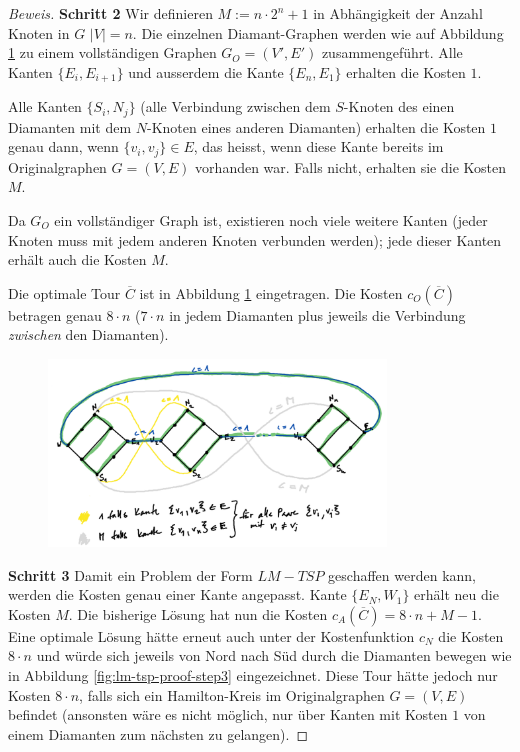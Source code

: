 \documentclass[a4paper,11pt]{scrreprt}
\begin{document}
\begin{proof}[Beweis]
\textbf{Schritt 2} Wir definieren $M := n \cdot 2^n + 1$ in Abhängigkeit der Anzahl Knoten in $G$ $|V| = n$. Die einzelnen Diamant-Graphen werden wie auf Abbildung \ref{fig:lm-tsp-proof-step2} zu einem vollständigen Graphen $G_O = (V', E')$ zusammengeführt. Alle Kanten $\{E_i, E_{i+1}\}$ und ausserdem die Kante $\{E_n, E_1\}$ erhalten die Kosten $1$. 

Alle Kanten $\{S_i, N_j\}$ (alle Verbindung zwischen dem $S$-Knoten des einen Diamanten mit dem $N$-Knoten eines anderen Diamanten) erhalten die Kosten $1$ genau dann, wenn $\{v_i, v_j\} \in E$, das heisst, wenn diese Kante bereits im Originalgraphen $G = (V, E)$ vorhanden war. Falls nicht, erhalten sie die Kosten $M$. 

Da $G_O$ ein vollständiger Graph ist, existieren noch viele weitere Kanten (jeder Knoten muss mit jedem anderen Knoten verbunden werden); jede dieser Kanten erhält auch die Kosten $M$. 

Die optimale Tour $\overline{C}$ ist in Abbildung \ref{fig:lm-tsp-proof-step2} eingetragen. Die Kosten $c_O(\overline{C})$ betragen genau $8 \cdot n$ ($7 \cdot n$ in jedem Diamanten plus jeweils die Verbindung \emph{zwischen} den Diamanten).

\begin{figure}[H]
\centering
\includegraphics[width=0.8\textwidth]{lm_tsp_proof_step2.png}
\caption{}
\label{fig:lm-tsp-proof-step2}
\end{figure}

\textbf{Schritt 3} Damit ein Problem der Form $LM-TSP$ geschaffen werden kann, werden die Kosten genau einer Kante angepasst. Kante $\{E_N, W_1\}$ erhält neu die Kosten $M$. Die bisherige Lösung hat nun die Kosten $c_A(\overline{C}) = 8 \cdot n + M - 1$. Eine optimale Lösung hätte erneut auch unter der Kostenfunktion $c_N$ die Kosten $8 \cdot n$ und würde sich jeweils von Nord nach Süd durch die Diamanten bewegen wie in Abbildung \ref{fig:lm-tsp-proof-step3} eingezeichnet. Diese Tour hätte jedoch nur Kosten $8 \cdot n$, falls sich ein Hamilton-Kreis im Originalgraphen $G = (V, E)$ befindet (ansonsten wäre es nicht möglich, nur über Kanten mit Kosten $1$ von einem Diamanten zum nächsten zu gelangen).


\end{proof}
\end{document}
